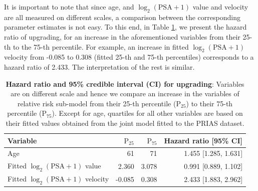 \begin{subappendices}
It is important to note that since age, and ${\log_2 (\mbox{PSA} + 1)}$ value and velocity are all measured on different scales, a comparison between the corresponding parameter estimates is not easy. To this end, in Table \ref{c5:tab:PSA_survival_easy}, we present the hazard ratio of upgrading, for an increase in the aforementioned variables from their 25-th to the 75-th percentile. For example, an increase in fitted $\log_2 (\mbox{PSA} + 1)$ velocity from -0.085 to 0.308 (fitted 25-th and 75-th percentiles) corresponds to a hazard ratio of 2.433. The interpretation of the rest is similar.

\begin{table}
\small
\centering
\caption{\textbf{Hazard ratio and 95\% credible interval (CI) for upgrading}: Variables are on different scale and hence we compare an increase in the variables of relative risk sub-model from their 25-th percentile ($\mbox{P}_{25}$) to their 75-th percentile ($\mbox{P}_{75}$). Except for age, quartiles for all other variables are based on their fitted values obtained from the joint model fitted to the PRIAS dataset.}
\label{c5:tab:PSA_survival_easy}
\begin{tabular}{lrrr}
\hline
Variable                      & $\mbox{P}_{25}$   & $\mbox{P}_{75}$ & Hazard ratio [95\% CI] \\
\hline
Age & 61 & 71 & 1.455 [1.285, 1.631] \\
Fitted $\log_2 (\mbox{PSA} + 1)$ value & 2.360 & 3.078 & 0.991 [0.889, 1.102] \\
Fitted $\log_2 (\mbox{PSA} + 1)$ velocity & -0.085 & 0.308 & 2.433 [1.883, 2.962] \\
\hline
\end{tabular}
\end{table}


\end{subappendices}
